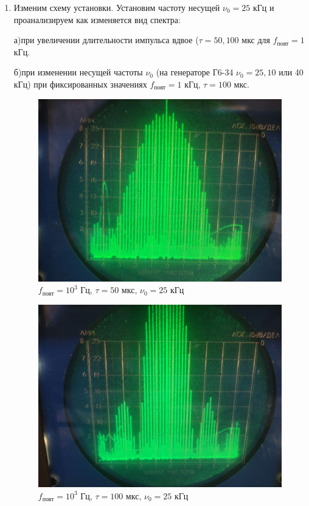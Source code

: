 \documentclass[a4paper, 12pt]{article}%
\begin{document}
\begin{enumerate}

\item Изменим схему установки. Установим частоту несущей $\nu_0 = 25$ кГц и проанализируем как изменяется вид спектра:

а)при увеличении длительности импульса вдвое ($\tau = 50, 100$ мкс для $f_{\text{повт}} = 1$ кГц.

б)при изменении несущей частоты $\nu_0$ (на генераторе Г6-34 $\nu_0 = 25, 10$ или 40 кГц) при фиксированных значениях $f_{\text{повт}} = 1$ кГц, $\tau = 100$ мкс.

\begin{figure}[h!]
\centering
\includegraphics[scale=0.2]{images/50_1000_25-b.jpg}
\caption{$f_{\text{повт}} = 10^3$ Гц, $\tau = 50$ мкс, $\nu_0 = 25$ кГц}
\label{fig:Image1}
\end{figure}

\begin{figure}[h!]
\centering
\includegraphics[scale=0.2]{images/100_1000_25-b.jpg}
\caption{$f_{\text{повт}} = 10^3$ Гц, $\tau = 100$ мкс, $\nu_0 = 25$ кГц}
\label{fig:Image1}
\end{figure}


\end{enumerate}
\end{document}
